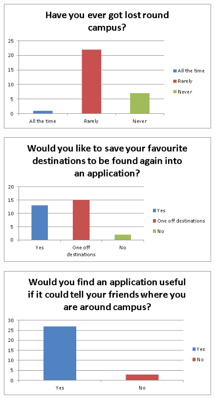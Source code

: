 \documentclass[10pt,oneside,notitlepage]{report}
\begin{document}
\begin{figure}[H]
 \centering
 \includegraphics[keepaspectratio]{4.png}
\end{figure}

\begin{figure}[H]
 \centering
 \includegraphics[keepaspectratio]{5.png}
\end{figure}

\begin{figure}[H]
 \centering
 \includegraphics[keepaspectratio]{6.png}
\end{figure}
\end{document}
